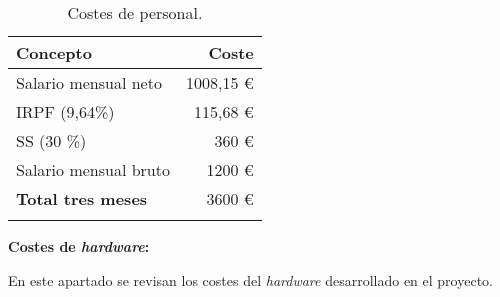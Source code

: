 \begin{longtable}[]{@{}lr@{}}
\toprule
\begin{minipage}[b]{0.38\columnwidth}\raggedright\strut
\textbf{Concepto}\strut
\end{minipage} & \begin{minipage}[b]{0.20\columnwidth}\raggedright\strut
\textbf{Coste}\strut
\end{minipage}\tabularnewline
\midrule
\endhead
\begin{minipage}[t]{0.38\columnwidth}\raggedright\strut
Salario mensual neto\strut
\end{minipage} & \begin{minipage}[t]{0.20\columnwidth}\raggedright\strut
1008,15 \euro{}\strut
\end{minipage}\tabularnewline
\begin{minipage}[t]{0.38\columnwidth}\raggedright\strut
IRPF (9,64\%)\strut
\end{minipage} & \begin{minipage}[t]{0.20\columnwidth}\raggedright\strut
115,68 \euro{}\strut
\end{minipage}\tabularnewline
\begin{minipage}[t]{0.38\columnwidth}\raggedright\strut
SS (30 \%)\strut
\end{minipage} & \begin{minipage}[t]{0.20\columnwidth}\raggedright\strut
360 \euro{}\strut
\end{minipage}\tabularnewline
\begin{minipage}[t]{0.38\columnwidth}\raggedright\strut
Salario mensual bruto\strut
\end{minipage} & \begin{minipage}[t]{0.20\columnwidth}\raggedright\strut
1200 \euro{}\strut
\end{minipage}\tabularnewline
\midrule
\begin{minipage}[t]{0.38\columnwidth}\raggedright\strut
\textbf{Total tres meses}\strut
\end{minipage} & \begin{minipage}[t]{0.20\columnwidth}\raggedright\strut
3600 \euro{}\strut
\end{minipage}\tabularnewline
\bottomrule
\caption{Costes de personal.}
\end{longtable}

\textbf{Costes de \emph{hardware}:}

En este apartado se revisan los costes del \emph{hardware} desarrollado en el proyecto.

